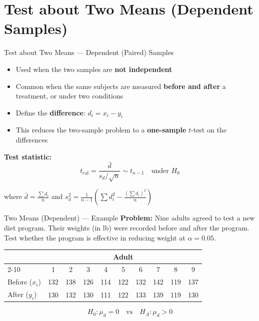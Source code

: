 \documentclass[12pt, aspectratio=169]{beamer}
\begin{document}
    \section{Test about Two Means (Dependent Samples)}


    \begin{frame}{Test about Two Means --- Dependent (Paired) Samples}
        \begin{itemize}
            \item Used when the two samples are \textbf{not independent}
            \item Common when the same subjects are measured \textbf{before and after}
                a treatment, or under two conditions
            \item Define the \textbf{difference}: $d_i = x_i - y_i$
            \item This reduces the two-sample problem to a \textbf{one-sample}
                $t$-test on the differences
        \end{itemize}

        \vspace{0.5em}

        \textbf{Test statistic:}
        \[
            t_{\text{cal}} = \frac{\bar{d}}{s_d/\sqrt{n}} \sim t_{n-1}
            \quad \text{under } H_0
        \]

        where $\bar{d} = \frac{\sum d_i}{n}$ and
        $s_d^2 = \frac{1}{n-1}\left(\sum d_i^2 - \frac{(\sum d_i)^2}{n}\right)$
    \end{frame}


    \begin{frame}{Two Means (Dependent) --- Example}
        \textbf{Problem:} Nine adults agreed to test a new diet program.
        Their weights (in lb) were recorded before and after the program.
        Test whether the program is effective in reducing weight at $\alpha = 0.05$.

        \vspace{0.5em}

        \begin{center}
            \small
            \begin{tabular}{lccccccccc}
                \toprule
                & \multicolumn{9}{c}{\textbf{Adult}} \\
                \cmidrule{2-10}
                & 1 & 2 & 3 & 4 & 5 & 6 & 7 & 8 & 9 \\
                \midrule
                Before ($x_i$) & 132 & 138 & 126 & 114 & 122 & 132 & 142 & 119 & 137 \\
                After ($y_i$) & 130 & 132 & 130 & 111 & 122 & 133 & 139 & 119 & 130 \\
                \bottomrule
            \end{tabular}
        \end{center}

        \[
            H_0: \mu_d = 0 \quad \text{vs} \quad H_A: \mu_d > 0
        \]
    \end{frame}
\end{document}
